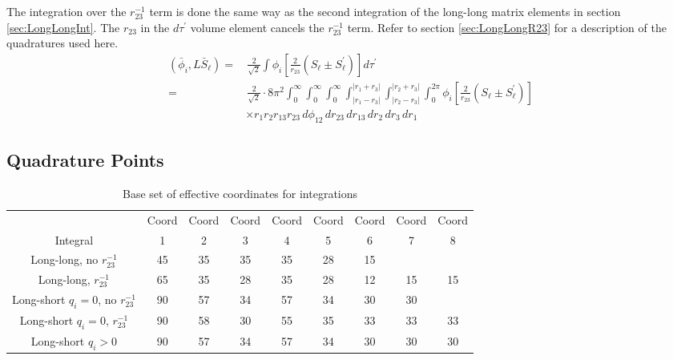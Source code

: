 \documentclass[Dissertation.tex]{subfiles}
\begin{document}
The integration over the $r_{23}^{-1}$ term is done the same way as the second integration of the long-long matrix elements in section \ref{sec:LongLongInt}.  The $r_{23}$ in the $d\tau^\prime$ volume element cancels the $r_{23}^{-1}$ term.  Refer to section \ref{sec:LongLongR23} for a description of the quadratures used here.
\begin{align}
\label{eq:PhiLSBarIntR23}
(\bar{\phi}_i, L\bar{S}_\ell) =& \,\frac{2}{\sqrt{2}} \int \phi_i \left[ \frac{2}{r_{23}}\left(S_\ell \pm S_\ell^\prime\right) \right] d\tau^\prime  \nonumber \\
=&\, \frac{2}{\sqrt{2}} \cdot 8\pi^2  \int_0^\infty \int_0^\infty \int_0^\infty \int_{|r_1 - r_3|}^{|r_1 + r_3|} \int_{|r_2 - r_3|}^{|r_2 + r_3|} \int_0^{2\pi} \phi_i \left[ \frac{2}{r_{23}}\left(S_\ell \pm S_\ell^\prime\right) \right]  \nonumber \\
&\times  r_1 r_2 r_{13} r_{23}\, d\phi_{12}\, dr_{23}\, dr_{13}\, dr_2\, dr_3\, dr_1
\end{align}




\subsection{Quadrature Points}
\label{sec:QuadraturePoints}


\begin{table}[H]
\centering
\footnotesize
\begin{tabular}{c c c c c c c c c}
\toprule
 & Coord & Coord & Coord & Coord & Coord & Coord & Coord & Coord\\
Integral & 1 & 2 & 3 & 4 & 5 & 6 & 7 & 8 \\
\midrule
 Long-long, no $r_{23}^{-1}$ & 45 & 35 & 35 & 35 & 28 & 15 & & \\
 Long-long, $r_{23}^{-1}$ & 65 & 35 & 28 & 35 & 28 & 12 & 15 & 15 \\
\midrule
 Long-short $q_i = 0$, no $r_{23}^{-1}$ & 90 & 57 & 34 & 57 & 34 & 30 & 30 & \\
 Long-short $q_i = 0$, $r_{23}^{-1}$ & 90 & 58 & 30 & 55 & 35 & 33 & 33 & 33 \\
 Long-short $q_i > 0$ & 90 & 57 & 34 & 57 & 34 & 30 & 30 & 30 \\
\bottomrule
\end{tabular}
\caption{Base set of effective coordinates for integrations}
\label{tab:BaseEffectiveCoords}
\end{table}
\end{document}
